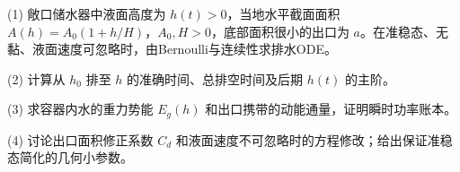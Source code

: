 (1) 敞口储水器中液面高度为 \(h(t)>0\)，当地水平截面面积 \(A(h)=A_0(1+h/H)\)，\(A_0,H>0\)，底部面积很小的出口为 \(a\)。在准稳态、无黏、液面速度可忽略时，由Bernoulli与连续性求排水ODE。

(2) 计算从 \(h_0\) 排至 \(h\) 的准确时间、总排空时间及后期 \(h(t)\) 的主阶。

(3) 求容器内水的重力势能 \(E_g(h)\) 和出口携带的动能通量，证明瞬时功率账本。

(4) 讨论出口面积修正系数 \(C_d\) 和液面速度不可忽略时的方程修改；给出保证准稳态简化的几何小参数。
